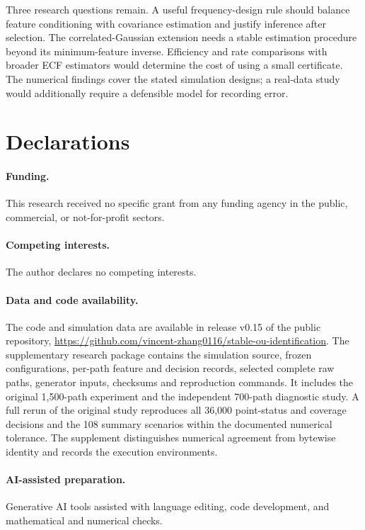 \documentclass[11pt,a4paper]{article}
\theoremstyle{remark}\newtheorem{remark}[theorem]{Remark}
\begin{document}
Three research questions remain. A useful frequency-design rule should balance feature conditioning with covariance estimation and justify inference after selection. The correlated-Gaussian extension needs a stable estimation procedure beyond its minimum-feature inverse. Efficiency and rate comparisons with broader ECF estimators would determine the cost of using a small certificate. The numerical findings cover the stated simulation designs; a real-data study would additionally require a defensible model for recording error.

\section*{Declarations}
\paragraph{Funding.}
This research received no specific grant from any funding agency in the public, commercial, or not-for-profit sectors.

\paragraph{Competing interests.}
The author declares no competing interests.

\paragraph{Data and code availability.}
The code and simulation data are available in release v0.15 of the public repository, \url{https://github.com/vincent-zhang0116/stable-ou-identification}. The supplementary research package contains the simulation source, frozen configurations, per-path feature and decision records, selected complete raw paths, generator inputs, checksums and reproduction commands. It includes the original 1,500-path experiment and the independent 700-path diagnostic study. A full rerun of the original study reproduces all 36,000 point-status and coverage decisions and the 108 summary scenarios within the documented numerical tolerance. The supplement distinguishes numerical agreement from bytewise identity and records the execution environments.

\paragraph{AI-assisted preparation.}
Generative AI tools assisted with language editing, code development, and mathematical and numerical checks.
\end{document}
